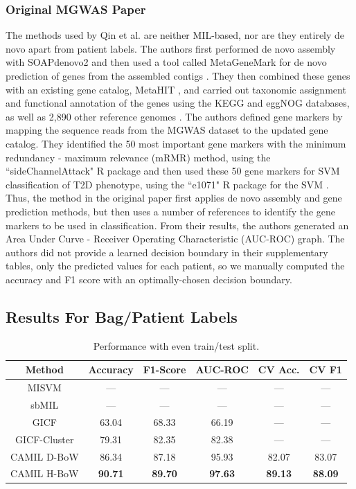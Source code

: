 \subsubsection{Original MGWAS Paper}

The methods used by Qin et al. \cite{qin041012} are neither MIL-based, nor are they entirely de novo apart from patient labels. The authors first performed de novo assembly with SOAPdenovo2 \cite{luo12} and then used a tool called MetaGeneMark \cite{zhu10, besemer99} for de novo prediction of genes from the assembled contigs \cite{qin041012}. They then combined these genes with an existing gene catalog, MetaHIT \cite{qin030410}, and carried out taxonomic assignment and functional annotation of the genes using the KEGG \cite{kanehisa00} and eggNOG \cite{powell12} databases, as well as 2,890 other reference genomes \cite{qin041012}. The authors defined gene markers by mapping the sequence reads from the MGWAS dataset to the updated gene catalog. They identified the 50 most important gene markers with the minimum redundancy - maximum relevance (mRMR) \cite{peng05} method, using the ``sideChannelAttack" R package and then used these 50 gene markers for SVM classification of T2D phenotype, using the ``e1071" R package for the SVM \cite{qin041012}. Thus, the method in the original paper first applies de novo assembly and gene prediction methods, but then uses a number of references to identify the gene markers to be used in classification. From their results, the authors generated an Area Under Curve - Receiver Operating Characteristic (AUC-ROC) graph. The authors did not provide a learned decision boundary in their supplementary tables, only the predicted values for each patient, so we manually computed the accuracy and F1 score with an optimally-chosen decision boundary. 



\subsection{Results For Bag/Patient Labels}

\begin{table}[h]
\begin{center} 
\caption{Performance with even train/test split.} 
\label{tab:even-comp}
\begin{tabular}{|c|ccccc|}\hline
Method & Accuracy & F1-Score & AUC-ROC & CV Acc. & CV F1\\\hline
MISVM & --- & --- & --- & --- & ---\\\hline
sbMIL & --- & --- & --- & --- & ---\\\hline
GICF & 63.04 & 68.33 & 66.19 & --- & ---\\\hline %
GICF-Cluster & 79.31 & 82.35 & 82.38 & --- & ---\\\hline
CAMIL D-BoW & 86.34 & 87.18 & 95.93 & 82.07 & 83.07\\\hline
CAMIL H-BoW & \bf{90.71} & \bf{89.70} & \bf{97.63} & \bf{89.13} & \bf{88.09}\\\hline
\end{tabular}
\end{center}
\end{table}

